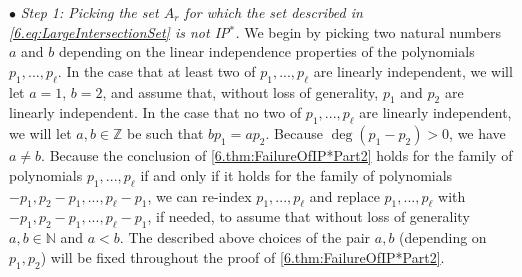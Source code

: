 \documentclass[11pt,american,preprint]{elsarticle}
\numberwithin{equation}{section}
\theoremstyle{plain}
\theoremstyle{plain*}
\theoremstyle{plain}
\theoremstyle{plain*}
\theoremstyle{plain}
\theoremstyle{plain*}
\theoremstyle{remark}
\theoremstyle{remark*}
\theoremstyle{remark}
\theoremstyle{remark*}
\theoremstyle{remark}
\theoremstyle{remark*}
\theoremstyle{plain}
\theoremstyle{definition}
\theoremstyle{plain}
\theoremstyle{plain} %
\newcommand{\N}{\mathbb{N}}
\newcommand{\Z}{\mathbb{Z}}
\begin{document}
$\bullet$ \textit{ Step 1: Picking the set $A_r$ for which 
the set described in \eqref{6.eq:LargeIntersectionSet} is not {\rm IP$^*$}.}   
We begin by picking  two  natural numbers $a$ and $b$ depending on the linear independence properties of the polynomials $p_1,...,p_\ell$. In the case that at least two of $p_1,...,p_\ell$ are linearly independent, we will let $a=1$, $b=2$, and assume that, without loss of generality, $p_1$ and $p_2$ are linearly independent. 
In the case that no two of $p_1,...,p_\ell$ are linearly independent, we will let $a,b\in\Z$ be such that $b p_1=a p_2$. Because $\deg(p_1-p_2)>0$, we have $a\neq b$. Because the conclusion of \cref{6.thm:FailureOfIP*Part2} holds for the family of polynomials $p_1,...,p_\ell$ if and only if it holds for the family of polynomials $-p_1,p_2-p_1,...,p_\ell-p_1$, we can re-index $p_1,...,p_\ell$ and replace $p_1,...,p_\ell$ with $-p_1,p_2-p_1,...,p_\ell-p_1$, if needed, to assume that  without loss of generality $a,b\in\N$ and  $a<b$. The described above choices of the pair $a,b$ (depending on $p_1,p_2$) will be fixed throughout the proof of \cref{6.thm:FailureOfIP*Part2}.\\  
\end{document}
